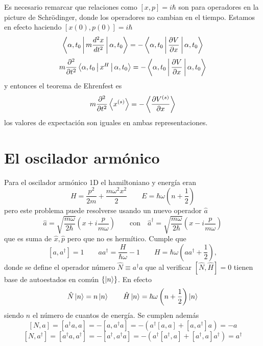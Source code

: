 \documentclass[10pt,oneside]{CBFT_book}
\begin{document}
Es necesario remarcar que relaciones como $[x,p]=i\hbar$ son para operadores en la picture de Schrödinger, donde los 
operadores no cambian en el tiempo. Estamos en efecto haciendo $[x(0),p(0)]=i\hbar$
\[
	\Braket{\alpha,t_0|m \dtot[2]{x}{t}|\alpha,t_0} = - \Braket{\alpha,t_0|\dpar{V}{x}|\alpha,t_0}
\]
\[
	m\dpar[2]{}{t}\Braket{\alpha,t_0| x^H |\alpha,t_0} = -\Braket{\alpha,t_0|\dpar{V}{x}|\alpha,t_0}
\]
y entonces el teorema de Ehrenfest es 
\[
	m \dpar[2]{}{t} \Braket{x^{(s)}} = - \Braket{ \dpar{V^{(s)}}{x}}
\]
los valores de expectación son iguales en ambas representaciones.
% 
\section{El oscilador armónico}

Para el oscilador armónico 1D  el hamiltoniano y energía eran
\[
	H = \frac{p^2}{2m} + \frac{m\omega^2 x^2}{2} \qquad E = \hbar \omega \left( n + \frac{1}{2} \right)
\]
pero este problema puede resolverse usando un nuevo operador $\hat{a}$
\[
	\hat{a} = \sqrt{\frac{m\omega}{2\hbar}}\left( x + i\frac{p}{m\omega} \right) \qquad \text{con} \quad 
	\hat{a}^\dagger = \sqrt{\frac{m\omega}{2\hbar}}\left( x - i\frac{p}{m\omega} \right)
\]
que es suma de $\hat{x}, \hat{p}$ pero que no es hermítico. Cumple que 
\[
	[a , a^\dagger ] = 1 \qquad a a^\dagger =  \frac{H}{\hbar\omega} -1 \qquad 
	H = \hbar\omega \left( a a^\dagger + \frac{1}{2} \right),
\]
donde se define el operador número $\hat{N}\equiv a^\dagger a$ que al verificar $[\hat{N},\hat{H}]=0$ tienen base de 
autoestados en común $\{ \Ket{n} \}$. En efecto 
\[
	\hat{N} \Ket{n} = n\Ket{n} \qquad
	\hat{H} \Ket{n} = \hbar\omega \left( n + \frac{1}{2} \right) \Ket{n}
\]
siendo $n$ el número de cuantos de energía.
Se cumplen además 
\[
	[N,a] = [a^\dagger a,a] = - [ a, a^\dagger a ] = - \left( a^\dagger [a,a] + [a,a^\dagger]a \right) =
	-a
\]
\[
	[N,a^\dagger] = [a^\dagger a, a^\dagger ] = - [a^\dagger , a^\dagger a ] =
	- \left( a^\dagger [a^\dagger,a] + [a^\dagger,a]a^\dagger \right) = a^\dagger
\]
\end{document}
